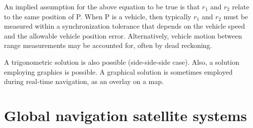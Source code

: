 An implied assumption for the above equation to be true is that $r_{1}$ and $r_{2}$ relate to
the same position of P.
When P is a vehicle, then typically $r_{1}$ and $r_{2}$ must be measured within a
synchronization tolerance that depends on the vehicle speed and the allowable vehicle
position error.
Alternatively, vehicle motion between range measurements may be accounted for,
often by dead reckoning.

A trigonometric solution is also possible (side-side-side case). Also, a solution employing 
graphics is possible. A graphical solution is sometimes employed during real-time navigation,
as an overlay on a map. 

\section{Global navigation satellite systems}





